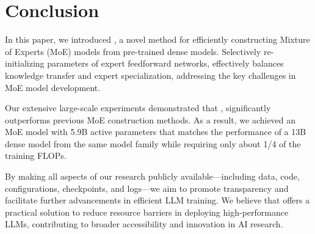 \section{Conclusion}

In this paper, we introduced \methodname{}, a novel method for efficiently constructing Mixture of Experts (MoE) models from pre-trained dense models. Selectively re-initializing parameters of expert feedforward networks, \methodname{} 
 effectively balances knowledge transfer and expert specialization, addressing the key challenges in MoE model development.

Our extensive large-scale experiments demonstrated that \methodname{},    
significantly outperforms previous MoE construction methods. As a result, we achieved an MoE model with 5.9B active parameters that matches the performance of a 13B dense model from the same model family while requiring only about 1/4 of the training FLOPs.

By making all aspects of our research publicly available—including data, code, configurations, checkpoints, and logs—we aim to promote transparency and facilitate further advancements in efficient LLM training. We believe that \methodname offers a practical solution to reduce resource barriers in deploying high-performance LLMs, contributing to broader accessibility and innovation in AI research.